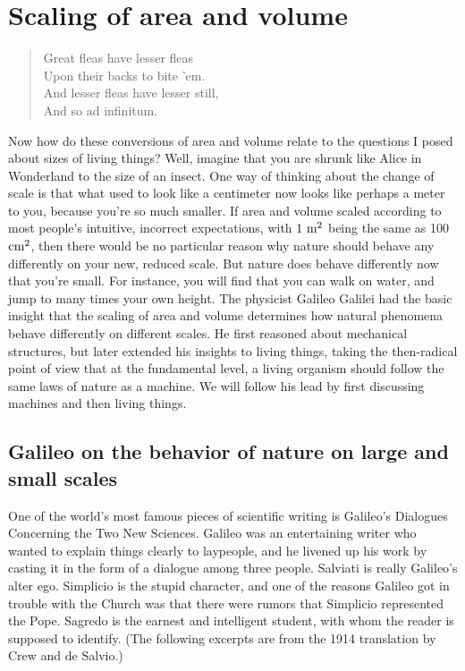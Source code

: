 \section{Scaling of area and volume}\label{sec:scaling}

\begin{verse}
Great fleas have lesser fleas\\
Upon their backs to bite 'em.\\
And lesser fleas have lesser still,\\
And so ad infinitum.
\end{verse}


Now how do these conversions of area and volume relate to
the questions I posed about sizes of living things? Well,
imagine that you are shrunk like Alice in Wonderland to the
size of an insect. One way of thinking about the change of
scale is that what used to look like a centimeter now looks
like perhaps a meter to you, because you're so much smaller.
If area and volume scaled according to most people's
intuitive, incorrect expectations, with $1\ \munit^2$ being the
same as 100 $\textup{cm}^2$, then there would be no particular reason
why nature should behave any differently on your new,
reduced scale. But nature does behave differently now that
you're small. For instance, you will find that you can walk
on water, and jump to many times your own height. The
physicist Galileo Galilei had the
basic insight that the scaling of area and volume determines
how natural phenomena behave differently on different
scales. He first reasoned about mechanical structures, but
later extended his insights to living things, taking the
then-radical point of view that at the fundamental level, a
living organism should follow the same laws of nature as a
machine. We will follow his lead by first discussing
machines and then living things.

\subsection{Galileo on the behavior of nature on large and small scales}

One of the world's most famous pieces of scientific writing
is Galileo's Dialogues Concerning the Two New Sciences. Galileo
was an entertaining writer who wanted to explain things
clearly to laypeople, and he livened up his work by casting
it in the form of a dialogue among three people. Salviati is
really Galileo's alter ego. Simplicio is the stupid
character, and one of the reasons Galileo got in trouble
with the Church was that there were rumors that Simplicio
represented the Pope. Sagredo is the earnest and
intelligent student, with whom the reader is supposed to
identify. (The following excerpts are from the 1914
translation by Crew and de Salvio.)

